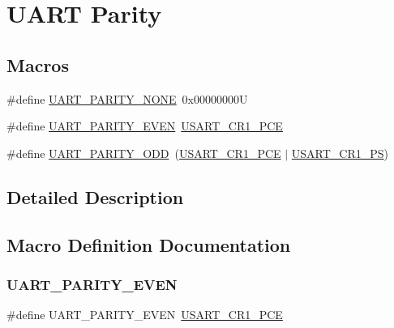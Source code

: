 \hypertarget{group___u_a_r_t___parity}{}\section{U\+A\+RT Parity}
\label{group___u_a_r_t___parity}
\subsection*{Macros}
\begin{DoxyCompactItemize}
\item 
\#define \mbox{\hyperlink{group___u_a_r_t___parity_ga270dea6e1a92dd83fe58802450bdd60c}{U\+A\+R\+T\+\_\+\+P\+A\+R\+I\+T\+Y\+\_\+\+N\+O\+NE}}~0x00000000U
\item 
\#define \mbox{\hyperlink{group___u_a_r_t___parity_ga063b14ac42ef9e8f4246c17a586b14eb}{U\+A\+R\+T\+\_\+\+P\+A\+R\+I\+T\+Y\+\_\+\+E\+V\+EN}}~\mbox{\hyperlink{group___peripheral___registers___bits___definition_ga60f8fcf084f9a8514efafb617c70b074}{U\+S\+A\+R\+T\+\_\+\+C\+R1\+\_\+\+P\+CE}}
\item 
\#define \mbox{\hyperlink{group___u_a_r_t___parity_ga229615e64964f68f7a856ea6ffea359e}{U\+A\+R\+T\+\_\+\+P\+A\+R\+I\+T\+Y\+\_\+\+O\+DD}}~(\mbox{\hyperlink{group___peripheral___registers___bits___definition_ga60f8fcf084f9a8514efafb617c70b074}{U\+S\+A\+R\+T\+\_\+\+C\+R1\+\_\+\+P\+CE}} $\vert$ \mbox{\hyperlink{group___peripheral___registers___bits___definition_ga2e159d36ab2c93a2c1942df60e9eebbe}{U\+S\+A\+R\+T\+\_\+\+C\+R1\+\_\+\+PS}})
\end{DoxyCompactItemize}


\subsection{Detailed Description}


\subsection{Macro Definition Documentation}
\mbox{\label{group___u_a_r_t___parity_ga063b14ac42ef9e8f4246c17a586b14eb}} 
\subsubsection{\texorpdfstring{UART\_PARITY\_EVEN}{UART\_PARITY\_EVEN}}
{\footnotesize\ttfamily \#define U\+A\+R\+T\+\_\+\+P\+A\+R\+I\+T\+Y\+\_\+\+E\+V\+EN~\mbox{\hyperlink{group___peripheral___registers___bits___definition_ga60f8fcf084f9a8514efafb617c70b074}{U\+S\+A\+R\+T\+\_\+\+C\+R1\+\_\+\+P\+CE}}}

